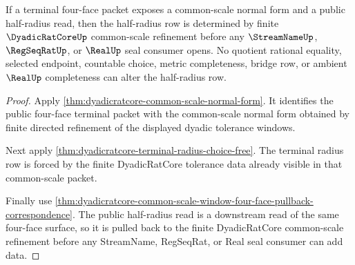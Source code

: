 \begin{theorem}
\label{thm:dyadicratcore-terminal-radius-half-step-inversion}
If a terminal four-face packet exposes a common-scale normal form and a public half-radius read, then the half-radius row is determined by finite $\DyadicRatCoreUp$ common-scale refinement before any $\StreamNameUp$, $\RegSeqRatUp$, or $\RealUp$ seal consumer opens. No quotient rational equality, selected endpoint, countable choice, metric completeness, bridge row, or ambient $\RealUp$ completeness can alter the half-radius row.
\end{theorem}
\begin{proof}
Apply \autoref{thm:dyadicratcore-common-scale-normal-form}. It identifies the public four-face terminal packet with the common-scale normal form obtained by finite directed refinement of the displayed dyadic tolerance windows.

Next apply \autoref{thm:dyadicratcore-terminal-radius-choice-free}. The terminal radius row is forced by the finite DyadicRatCore tolerance data already visible in that common-scale packet.

Finally use \autoref{thm:dyadicratcore-common-scale-window-four-face-pullback-correspondence}. The public half-radius read is a downstream read of the same four-face surface, so it is pulled back to the finite DyadicRatCore common-scale refinement before any StreamName, RegSeqRat, or Real seal consumer can add data.
\end{proof}

